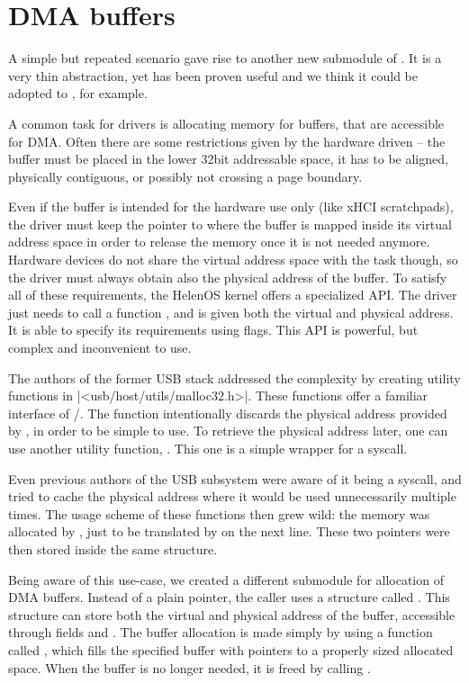 \section{DMA buffers}

A simple but repeated scenario gave rise to another new submodule of
. It is a very thin abstraction, yet has been proven useful and we
think it could be adopted to , for example.

A common task for drivers is allocating memory for buffers, that are accessible
for DMA. Often there are some restrictions given by the hardware driven -- the
buffer must be placed in the lower 32bit addressable space, it has to be
aligned, physically contiguous, or possibly not crossing a page boundary.

Even if the buffer is intended for the hardware use only (like xHCI
scratchpads), the driver must keep the pointer to where the buffer is mapped
inside its virtual address space in order to release the memory once it is not
needed anymore. Hardware devices do not share the virtual address space with
the task though, so the driver must always obtain also the physical address of
the buffer. To satisfy all of these requirements, the HelenOS kernel offers
a specialized API. The driver just needs to call a function
, and is given both the virtual and physical address. It
is able to specify its requirements using flags. This API is powerful, but
complex and inconvenient to use.

The authors of the former USB stack addressed the complexity by creating
utility functions in \header|<usb/host/utils/malloc32.h>|. These functions offer
a familiar interface of /. The  function
intentionally discards the physical address provided by
, in order to be simple to use. To retrieve the physical
address later, one can use another utility function, . This
one is a simple wrapper for a syscall.

Even previous authors of the USB subsystem were aware of it being a syscall,
and tried to cache the physical address where it would be used unnecessarily
multiple times. The usage scheme of these functions then grew wild: the memory
was allocated by , just to be translated by  on
the next line. These two pointers were then stored inside the same structure.

Being aware of this use-case, we created a different submodule for allocation
of DMA buffers. Instead of a plain pointer, the caller uses a structure called
. This structure can store both the virtual and physical
address of the buffer, accessible through fields  and
. The buffer allocation is made simply by using a function called
, which fills the specified buffer with pointers to
a properly sized allocated space. When the buffer is no longer needed, it is
freed by calling .

